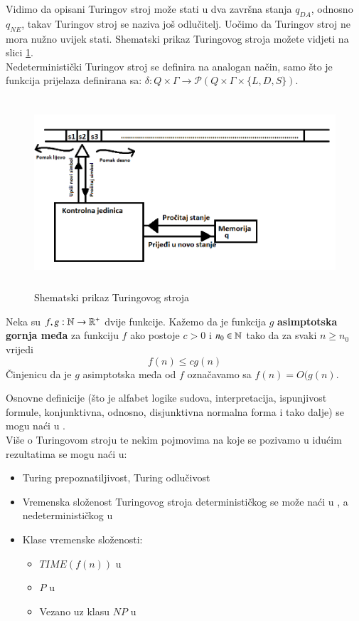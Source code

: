 \documentclass[a4paper,oneside,12pt]{memoir} %
\begin{document}
\begin{spacing}{1.5}
\begin{rem}
Vidimo da opisani Turingov stroj može stati u dva završna stanja $q_{DA}$, odnosno $q_{NE}$, takav Turingov stroj se naziva još odlučitelj. Uočimo da Turingov stroj ne mora nužno uvijek stati. Shematski prikaz Turingovog stroja možete vidjeti na slici \ref{fig:Turing}.\\
Nedeterministički Turingov stroj se definira na analogan način, samo što je funkcija prijelaza definirana sa: $\delta : Q \times \Gamma \to \mathcal{P}(Q \times \Gamma \times \{L,D,S\})$. 
\end{rem}
\begin{figure}[h!t]
\centering \includegraphics[height=200pt, width=400pt]{Turing.png}
\caption{Shematski prikaz Turingovog stroja}
\label{fig:Turing}
\end{figure} 
\begin{defn}
Neka su $f, g: \mathbb{N} \to \mathbb{R}^{+}$ dvije funkcije. Kažemo da je funkcija $g$ \textbf{asimptotska gornja međa} za funkciju $f$ ako postoje $c>0$ i $n_0 \in \mathbb{N}$ tako da za svaki $n \geq n_0$ vrijedi
\[f(n)\leq cg(n)\]
Činjenicu da je $g$ asimptotska međa od $f$ označavamo sa $f(n)=O(g(n)$. 
\end{defn}
Osnovne definicije (što je alfabet logike sudova, interpretacija, ispunjivost formule, konjunktivna, odnosno, disjunktivna normalna forma  i tako dalje) se mogu naći u \cite[s. ~12-25]{Vukovic}.\\
Više o Turingovom stroju te nekim pojmovima na koje se pozivamo u idućim rezultatima se mogu naći u:
\begin{itemize}
\item Turing prepoznatiljivost, Turing odlučivost \cite[s. ~141-142]{Sipser}
\item Vremenska složenost Turingovog stroja determinističkog se može naći u \cite[s. ~248]{Sipser}, a nedeterminističkog u \cite[s. ~255]{Sipser}
\item Klase vremenske složenosti:
 \begin{itemize}
 	\item $TIME(f(n))$ u \cite[s. ~251]{Sipser}
 	\item $P$  u \cite[s. ~258]{Sipser}
 	\item Vezano uz klasu $NP$ u \cite[s. ~265-267]{Sipser}
 \end{itemize}
 

\end{itemize}
\end{spacing}
\end{document}
